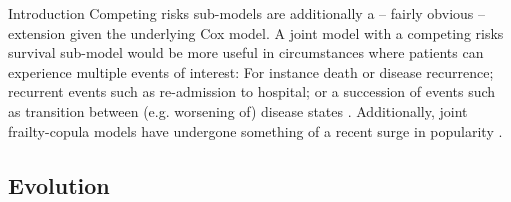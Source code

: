 \begin{chapter}{\label{cha:intro}Introduction}
  Competing risks sub-models are additionally a -- fairly obvious -- extension given the underlying Cox model. A joint model with a competing risks survival sub-model \citep{Williamson2008, Li2010} would be more useful in circumstances where patients can experience multiple events of interest: For instance death or disease recurrence; recurrent events such as re-admission to hospital; or a succession of events such as transition between (e.g. worsening of) disease states \citep{Hickey2018B}. Additionally, joint frailty-copula models have undergone something of a recent surge in popularity \citep{Emura2017, Peng2018, Sofeu2021}.
  
  \subsection{Evolution}
  

\end{chapter}
